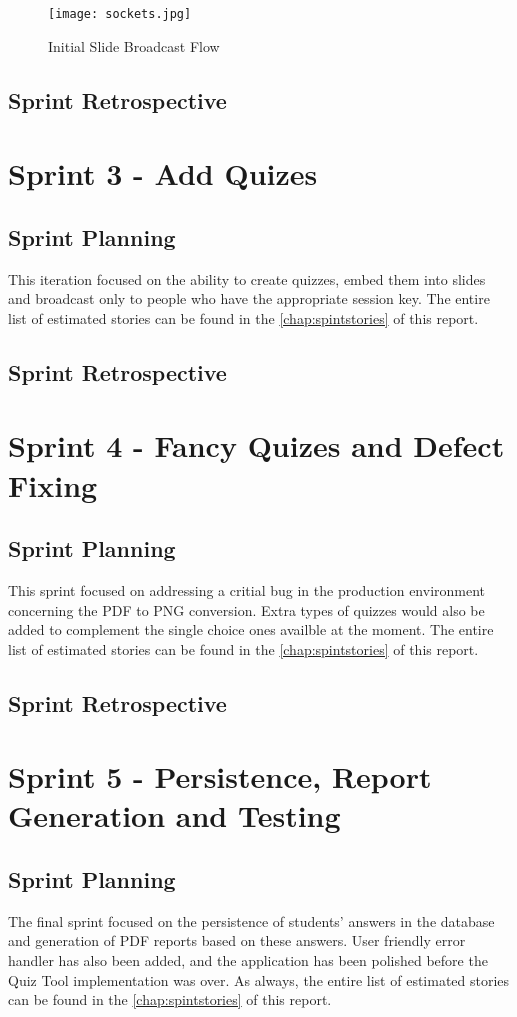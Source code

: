 \begin{figure}[h!]
    \centering
    \texttt{[image: sockets.jpg]}
    \caption{Initial Slide Broadcast Flow}
    \label{fig:sockets}
\end{figure}

\subsection{Sprint Retrospective}


\section{Sprint 3 - Add Quizes}
\subsection{Sprint Planning}
This iteration focused on the ability to create quizzes, embed them into slides and
broadcast only to people who have the appropriate session key. The entire list of estimated stories
can be found in the \autoref{chap:spintstories} of this report.

\subsection{Sprint Retrospective}


\section{Sprint 4 - Fancy Quizes and Defect Fixing}
\subsection{Sprint Planning}
This sprint focused on addressing a critial bug in the production environment
concerning the PDF to PNG conversion. Extra types of quizzes would also be added
to complement the single choice ones availble at the moment. The entire list of estimated stories
can be found in the \autoref{chap:spintstories} of this report.

\subsection{Sprint Retrospective}
\section{Sprint 5 - Persistence, Report Generation and Testing}
\subsection{Sprint Planning}
The final sprint focused on the persistence of students' answers in the database and
generation of PDF reports based on these answers. User friendly error handler has
also been added, and the application has been polished before the Quiz Tool implementation
was over. As always, the entire list of estimated stories
can be found in the \autoref{chap:spintstories} of this report.

